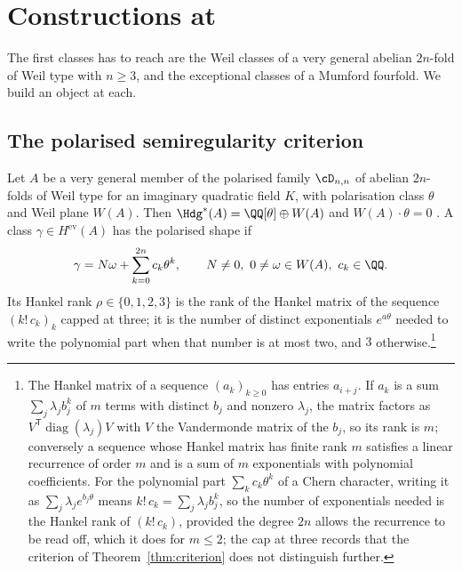 \section{Constructions at \Fii{}}\label{sec:f2}

The first classes \Fii{} has to reach are the Weil classes of a very general abelian $2n$-fold of Weil type with $n\ge3$, and the exceptional classes of a Mumford fourfold. We build an object at each.

\subsection{The polarised semiregularity criterion}\label{ssec:criterion}

Let $A$ be a very general member of the polarised family $\cD_{n,n}$ of abelian $2n$-folds of Weil type for an imaginary quadratic field $K$, with polarisation class $\theta$ and Weil plane $W(A)$. Then $\Hdg^{*}(A)=\QQ[\theta]\oplus W(A)$ and $W(A)\cdot\theta=0$ \cite[Thm.~4.14]{BMB26}. A class $\gamma\in H^{\mathrm{ev}}(A)$ has the polarised shape if
\[
\gamma=N\omega+\sum_{k=0}^{2n}c_{k}\theta^{k},\qquad N\ne0,\ 0\ne\omega\in W(A),\ c_{k}\in\QQ .
\]
Its Hankel rank $\rho\in\{0,1,2,3\}$ is the rank of the Hankel matrix of the sequence $(k!\,c_{k})_{k}$ capped at three; it is the number of distinct exponentials $e^{a\theta}$ needed to write the polynomial part when that number is at most two, and $3$ otherwise.\footnote{The Hankel matrix of a sequence $(a_{k})_{k\ge0}$ has entries $a_{i+j}$. If $a_{k}$ is a sum $\sum_{j}\lambda_{j}b_{j}^{k}$ of $m$ terms with distinct $b_{j}$ and nonzero $\lambda_{j}$, the matrix factors as $V^{\mathsf{T}}\operatorname{diag}(\lambda_{j})V$ with $V$ the Vandermonde matrix of the $b_{j}$, so its rank is $m$; conversely a sequence whose Hankel matrix has finite rank $m$ satisfies a linear recurrence of order $m$ and is a sum of $m$ exponentials with polynomial coefficients. For the polynomial part $\sum_{k}c_{k}\theta^{k}$ of a Chern character, writing it as $\sum_{j}\lambda_{j}e^{b_{j}\theta}$ means $k!\,c_{k}=\sum_{j}\lambda_{j}b_{j}^{k}$, so the number of exponentials needed is the Hankel rank of $(k!\,c_{k})$, provided the degree $2n$ allows the recurrence to be read off, which it does for $m\le2$; the cap at three records that the criterion of Theorem~\ref{thm:criterion} does not distinguish further.}

